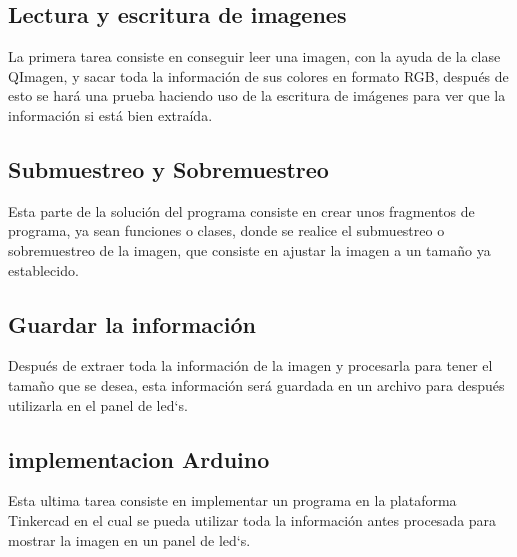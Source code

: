 \documentclass{article}
\begin{document}
\subsection{Lectura y escritura de imagenes}
La primera tarea consiste en conseguir leer una imagen, con la ayuda de la clase QImagen, y sacar toda la información de sus colores en formato RGB, después de esto se hará una prueba haciendo uso de la escritura de imágenes para ver que la información si está bien extraída.
\subsection{Submuestreo y Sobremuestreo}
Esta parte de la solución del programa consiste en crear unos fragmentos de programa, ya sean funciones o clases, donde se realice el submuestreo o sobremuestreo de la imagen, que consiste en ajustar la imagen a un tamaño ya establecido.
\subsection{Guardar la información}
Después de extraer toda la información de la imagen y procesarla para tener el tamaño que se desea, esta información será guardada en un archivo para después utilizarla en el panel de led`s.
\subsection{implementacion Arduino}
Esta ultima tarea consiste en implementar un programa en la plataforma Tinkercad en el cual se pueda utilizar toda la información antes procesada para mostrar la imagen en un panel de led`s.
\end{document}
